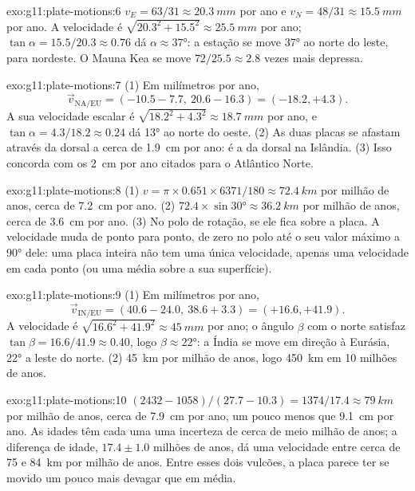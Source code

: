\begin{solution}{exo:g11:plate-motions:6}
$v_E = 63/31 \approx \qty{20.3}{mm}$ por ano e $v_N = 48/31 \approx
\qty{15.5}{mm}$ por ano. A velocidade é $\sqrt{20.3^2 + 15.5^2} \approx
\qty{25.5}{mm}$ por ano; $\tan\alpha = 15.5/20.3 \approx 0.76$ dá $\alpha
\approx \ang{37}$: a estação se move \ang{37} ao norte do leste, para
nordeste. O Mauna Kea se move $72/25.5 \approx 2.8$ vezes mais depressa.
\end{solution}

\begin{solution}{exo:g11:plate-motions:7}
(1) Em milímetros por ano,
\[
  \vec v_{\mathrm{NA/EU}} = (-10.5 - 7.7,\ 20.6 - 16.3) = (-18.2, +4.3).
\] A sua velocidade escalar é $\sqrt{18.2^2 + 4.3^2} \approx
\qty{18.7}{mm}$ por ano, e $\tan\alpha = 4.3/18.2 \approx 0.24$ dá
\ang{13} ao norte do oeste. (2) As duas placas se afastam através da dorsal
a cerca de \qty{1.9}{cm} por ano: é a  da dorsal na
Islândia. (3) Isso concorda com os \qty{2}{cm} por ano citados para o
Atlântico Norte.
\end{solution}

\begin{solution}{exo:g11:plate-motions:8}
(1) $v = \pi \times 0.651 \times 6371/180 \approx \qty{72.4}{km}$ por milhão
de anos, cerca de \qty{7.2}{cm} por ano. (2) $72.4 \times \sin\ang{30} \approx
\qty{36.2}{km}$ por milhão de anos, cerca de \qty{3.6}{cm} por ano. (3) No
polo de rotação, se ele fica sobre a placa. A velocidade muda de ponto para
ponto, de zero no polo até o seu valor máximo a \ang{90} dele: uma placa
inteira não tem uma única velocidade, apenas uma velocidade em cada ponto
(ou uma média sobre a sua superfície).
\end{solution}

\begin{solution}{exo:g11:plate-motions:9}
(1) Em milímetros por ano,
\[
  \vec v_{\mathrm{IN/EU}} = (40.6 - 24.0,\ 38.6 + 3.3) = (+16.6, +41.9).
\] A velocidade é $\sqrt{16.6^2 + 41.9^2} \approx
\qty{45}{mm}$ por ano; o ângulo $\beta$ com o norte satisfaz $\tan\beta =
16.6/41.9 \approx 0.40$, logo $\beta \approx \ang{22}$: a Índia se move em
direção à Eurásia, \ang{22} a leste do norte. (2) \qty{45}{km} por milhão de
anos, logo \qty{450}{km} em 10 milhões de anos.
\end{solution}

\begin{solution}{exo:g11:plate-motions:10}
$(2432 - 1058)/(27.7 - 10.3) = 1374/17.4 \approx \qty{79}{km}$ por milhão
de anos, cerca de \qty{7.9}{cm} por ano, um pouco menos que \qty{9.1}{cm}
por ano. As idades têm cada uma uma incerteza de cerca de meio milhão de
anos; a diferença de idade, $17.4 \pm 1.0$ milhões de anos, dá uma
velocidade entre cerca de 75 e \qty{84}{km} por milhão de anos. Entre esses
dois vulcões, a placa parece ter se movido um pouco mais devagar que em
média.
\end{solution}

